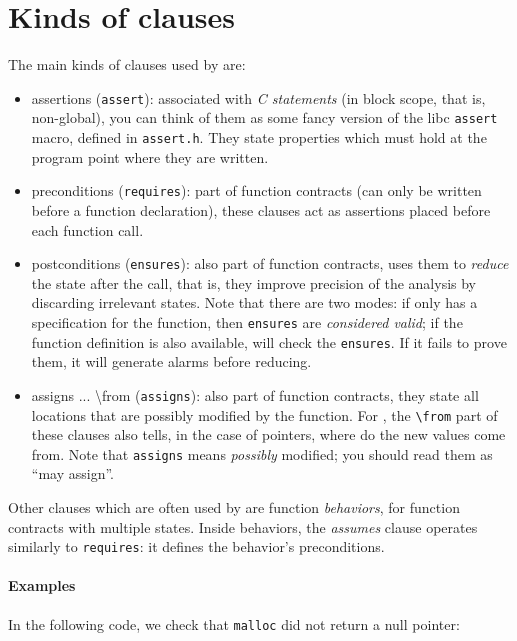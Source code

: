 \documentclass{frama-c-book}
\begin{document}
\section{Kinds of clauses}

The main kinds of clauses used by \Eva{} are:
\begin{itemize}
\item assertions (\texttt{assert}): associated with {\em C statements}
  (in block scope, that is, non-global), you can think of them as some
  fancy version of the libc \texttt{assert} macro, defined in
  \texttt{assert.h}. They state properties which must hold at the program
  point where they are written.
\item preconditions (\texttt{requires}): part of function contracts
  (can only be written before a function declaration), these clauses
  act as assertions placed before each function call.
\item postconditions (\texttt{ensures}): also part of function contracts,
  \Eva{} uses them to {\em reduce} the state after the call, that is, they
  improve precision of the analysis by discarding irrelevant states.
  Note that there are two modes: if \Eva{} only has a specification for the
  function, then \texttt{ensures} are {\em considered valid}; if the function
  definition is also available, \Eva{} will check the \texttt{ensures}. If it
  fails to prove them, it will generate alarms before reducing.
\item assigns ... \textbackslash{}from (\texttt{assigns}): also part of function contracts,
  they state all locations that are possibly modified by the function. For \Eva{},
  the \verb+\from+ part of these clauses also tells, in the case of pointers,
  where do the new values come from. Note that \verb+assigns+ means
  {\em possibly} modified; you should read them as ``may assign''.
\end{itemize}

Other clauses which are often used by \Eva{} are function {\em behaviors}, for
function contracts with multiple states. Inside behaviors, the {\em assumes}
clause operates similarly to \texttt{requires}: it defines the behavior's
preconditions.

\paragraph{Examples}

In the following code, we check that \texttt{malloc} did not return a null
pointer:
\end{document}
